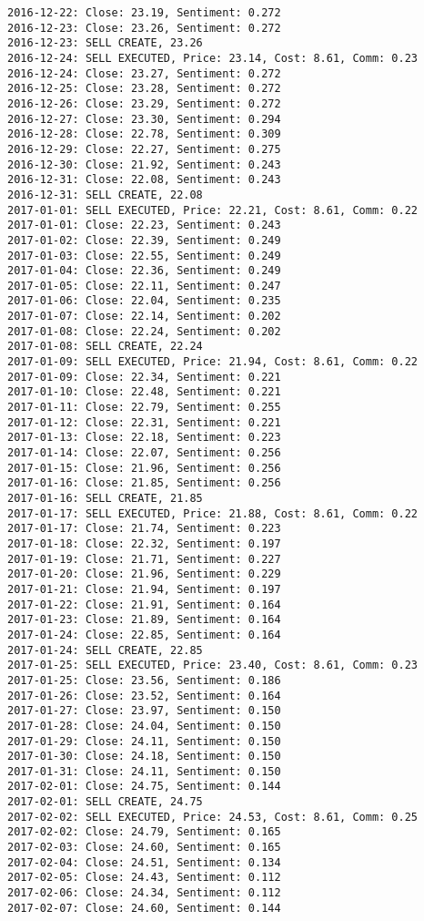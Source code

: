 \documentclass[11pt]{article}
\begin{document}
\begin{Verbatim}[commandchars=\\\{\}]
2016-12-22: Close: 23.19, Sentiment: 0.272
2016-12-23: Close: 23.26, Sentiment: 0.272
2016-12-23: SELL CREATE, 23.26
2016-12-24: SELL EXECUTED, Price: 23.14, Cost: 8.61, Comm: 0.23
2016-12-24: Close: 23.27, Sentiment: 0.272
2016-12-25: Close: 23.28, Sentiment: 0.272
2016-12-26: Close: 23.29, Sentiment: 0.272
2016-12-27: Close: 23.30, Sentiment: 0.294
2016-12-28: Close: 22.78, Sentiment: 0.309
2016-12-29: Close: 22.27, Sentiment: 0.275
2016-12-30: Close: 21.92, Sentiment: 0.243
2016-12-31: Close: 22.08, Sentiment: 0.243
2016-12-31: SELL CREATE, 22.08
2017-01-01: SELL EXECUTED, Price: 22.21, Cost: 8.61, Comm: 0.22
2017-01-01: Close: 22.23, Sentiment: 0.243
2017-01-02: Close: 22.39, Sentiment: 0.249
2017-01-03: Close: 22.55, Sentiment: 0.249
2017-01-04: Close: 22.36, Sentiment: 0.249
2017-01-05: Close: 22.11, Sentiment: 0.247
2017-01-06: Close: 22.04, Sentiment: 0.235
2017-01-07: Close: 22.14, Sentiment: 0.202
2017-01-08: Close: 22.24, Sentiment: 0.202
2017-01-08: SELL CREATE, 22.24
2017-01-09: SELL EXECUTED, Price: 21.94, Cost: 8.61, Comm: 0.22
2017-01-09: Close: 22.34, Sentiment: 0.221
2017-01-10: Close: 22.48, Sentiment: 0.221
2017-01-11: Close: 22.79, Sentiment: 0.255
2017-01-12: Close: 22.31, Sentiment: 0.221
2017-01-13: Close: 22.18, Sentiment: 0.223
2017-01-14: Close: 22.07, Sentiment: 0.256
2017-01-15: Close: 21.96, Sentiment: 0.256
2017-01-16: Close: 21.85, Sentiment: 0.256
2017-01-16: SELL CREATE, 21.85
2017-01-17: SELL EXECUTED, Price: 21.88, Cost: 8.61, Comm: 0.22
2017-01-17: Close: 21.74, Sentiment: 0.223
2017-01-18: Close: 22.32, Sentiment: 0.197
2017-01-19: Close: 21.71, Sentiment: 0.227
2017-01-20: Close: 21.96, Sentiment: 0.229
2017-01-21: Close: 21.94, Sentiment: 0.197
2017-01-22: Close: 21.91, Sentiment: 0.164
2017-01-23: Close: 21.89, Sentiment: 0.164
2017-01-24: Close: 22.85, Sentiment: 0.164
2017-01-24: SELL CREATE, 22.85
2017-01-25: SELL EXECUTED, Price: 23.40, Cost: 8.61, Comm: 0.23
2017-01-25: Close: 23.56, Sentiment: 0.186
2017-01-26: Close: 23.52, Sentiment: 0.164
2017-01-27: Close: 23.97, Sentiment: 0.150
2017-01-28: Close: 24.04, Sentiment: 0.150
2017-01-29: Close: 24.11, Sentiment: 0.150
2017-01-30: Close: 24.18, Sentiment: 0.150
2017-01-31: Close: 24.11, Sentiment: 0.150
2017-02-01: Close: 24.75, Sentiment: 0.144
2017-02-01: SELL CREATE, 24.75
2017-02-02: SELL EXECUTED, Price: 24.53, Cost: 8.61, Comm: 0.25
2017-02-02: Close: 24.79, Sentiment: 0.165
2017-02-03: Close: 24.60, Sentiment: 0.165
2017-02-04: Close: 24.51, Sentiment: 0.134
2017-02-05: Close: 24.43, Sentiment: 0.112
2017-02-06: Close: 24.34, Sentiment: 0.112
2017-02-07: Close: 24.60, Sentiment: 0.144

\end{Verbatim}
\end{document}
